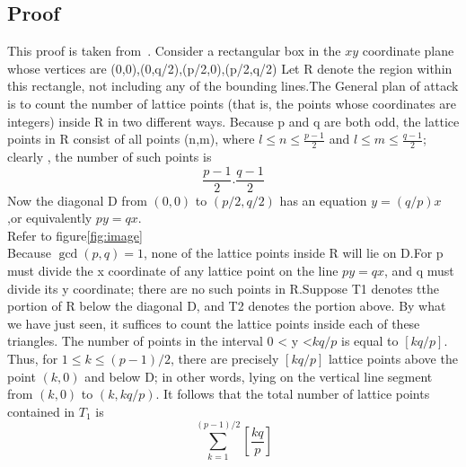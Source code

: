 \documentclass[20pt,a4paper]{article}
\begin{document}
\subsection{Proof}
This proof is taken from~\cite{enwiki:1140127449}.
Consider a rectangular box in the $xy$ coordinate plane whose vertices are (0,0),(0,q/2),(p/2,0),(p/2,q/2) Let R denote the  region within this rectangle, not including any of the bounding lines.The General plan of attack is to count the number of lattice points (that is, the points whose coordinates are integers) inside R in two different ways.
Because p and q are both odd, the lattice points in R consist of all points (n,m), where $l \leq n \leq \frac{p-1}{2}$ and $l \leq m \leq \frac{q-1}{2}$; clearly , the number of such points is 
\[
        \frac{p-1}{2}.\frac{q-1}{2}
\]
Now the diagonal D from $(0,0)$ to $(p/2,q/2)$ has an equation $y=(q/p)x$ ,or equivalently $py=qx$. \\
Refer to figure\ref{fig:image}\\
Because $\gcd(p,q)=1$, none of the lattice points inside R will lie on D.For p must divide the x coordinate of any lattice point on the line $py=qx$, and q must divide its y coordinate; there are no such points in R.Suppose T1 denotes tthe portion of R below the diagonal D, and T2 denotes the portion above. By what we have just seen, it suffices to count the lattice points inside each of these triangles.
The number of points in the interval 0 < y <$kq/p$ is equal to $[kq/p]$. Thus, for $1\leq k \leq (p-1)/2$, there are precisely $[kq/p]$ lattice points above the point $(k,0)$ and below D; in other words, lying on the vertical line segment from $(k,0)$ to $(k,kq/p)$. It follows that the total number of lattice points contained in $T_1$ is
\[
\sum_{k=1}^{(p-1)/2} [\frac{kq}{p}]
\]
\end{document}
